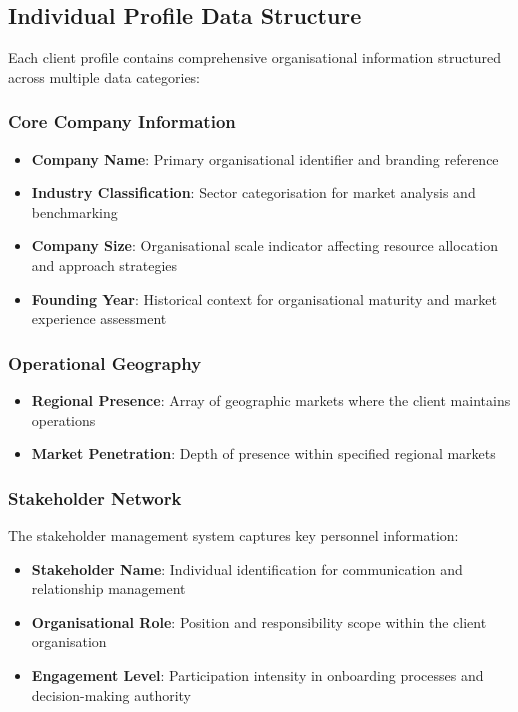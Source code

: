 \documentclass{article}
\begin{document}
\subsection{Individual Profile Data Structure}
Each client profile contains comprehensive organisational information structured across multiple data categories:

\subsubsection{Core Company Information}
\begin{itemize}
    \item \textbf{Company Name}: Primary organisational identifier and branding reference
    \item \textbf{Industry Classification}: Sector categorisation for market analysis and benchmarking
    \item \textbf{Company Size}: Organisational scale indicator affecting resource allocation and approach strategies
    \item \textbf{Founding Year}: Historical context for organisational maturity and market experience assessment
\end{itemize}

\subsubsection{Operational Geography}
\begin{itemize}
    \item \textbf{Regional Presence}: Array of geographic markets where the client maintains operations
    \item \textbf{Market Penetration}: Depth of presence within specified regional markets
\end{itemize}

\subsubsection{Stakeholder Network}
The stakeholder management system captures key personnel information:

\begin{itemize}
    \item \textbf{Stakeholder Name}: Individual identification for communication and relationship management
    \item \textbf{Organisational Role}: Position and responsibility scope within the client organisation
    \item \textbf{Engagement Level}: Participation intensity in onboarding processes and decision-making authority
\end{itemize}
\end{document}

